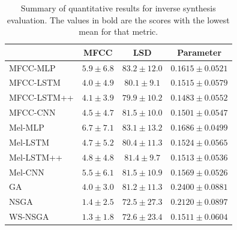 \begin{table}[ht]
\centering
\begin{tabular}{l|ccc}
\toprule
{} & MFCC & LSD & Parameter \\
\midrule
MFCC-MLP    &       $5.9 \pm      6.8$ &     $83.2 \pm    12.0$ &     $0.1615 \pm    0.0521$ \\
MFCC-LSTM   &       $4.0 \pm      4.9$ &     $80.1 \pm     9.1$ &     $0.1515 \pm    0.0579$ \\
MFCC-LSTM++ &       $4.1 \pm      3.9$ &     $79.9 \pm    10.2$ &     $0.1483 \pm    0.0552$ \\
MFCC-CNN    &       $4.5 \pm      4.7$ &     $81.5 \pm    10.0$ &     $\mathbf{0.1501 \pm    0.0547}$ \\
\midrule
Mel-MLP     &       $6.7 \pm      7.1$ &     $83.1 \pm    13.2$ &     $0.1686 \pm    0.0499$ \\
Mel-LSTM    &       $4.7 \pm      5.2$ &     $80.4 \pm    11.3$ &     $0.1524 \pm    0.0565$ \\
Mel-LSTM++  &       $4.8 \pm      4.8$ &     $81.4 \pm     9.7$ &     $0.1513 \pm    0.0536$ \\
Mel-CNN    &       $5.5 \pm      6.1$ &     $81.5 \pm    10.9$ &     $0.1569 \pm    0.0526$ \\
\midrule
GA          &       $4.0 \pm      3.0$ &     $81.2 \pm    11.3$ &     $0.2400 \pm    0.0881$ \\
NSGA        &       $1.4 \pm      2.5$ &     $\mathbf{72.5 \pm    27.3}$ &     $0.2120 \pm    0.0897$ \\
WS-NSGA     &       $\mathbf{1.3 \pm      1.8}$ &     $72.6 \pm    23.4$ &     $0.1511 \pm    0.0604$ \\
\bottomrule
\end{tabular}
\caption{Summary of quantitative results for inverse synthesis evaluation. The values in bold are the scores with the lowest mean for that metric.}
\label{tbl:objective_resuls}
\end{table}

